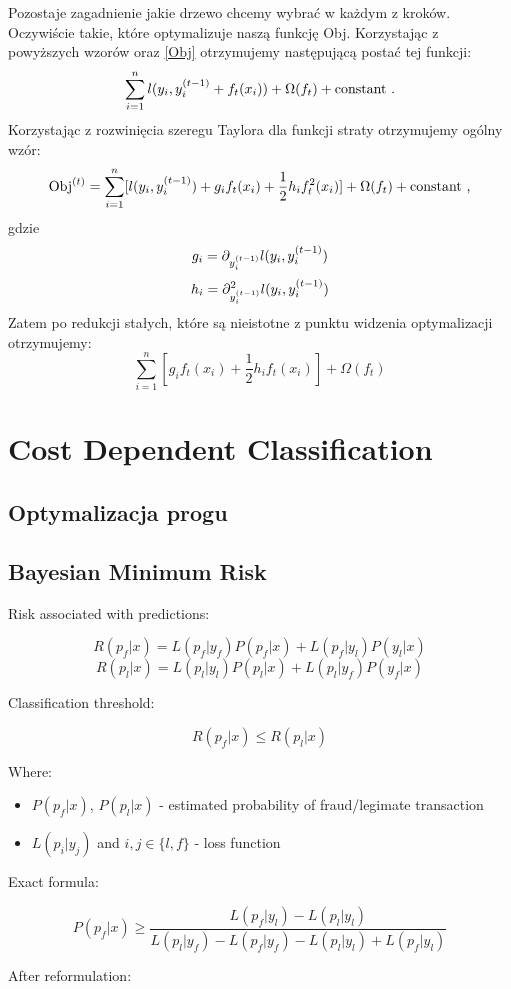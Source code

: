 \documentclass{book}
\begin{document}
	 Pozostaje zagadnienie jakie drzewo chcemy wybrać w każdym z kroków. Oczywiście takie, które optymalizuje naszą funkcję Obj. Korzystając z powyższych wzorów oraz \ref{Obj} otrzymujemy następującą postać tej funkcji:
	 $$ \sum_{i=1}^{n} l(y_i, y_i^{(t-1)} + f_t(x_i)) + \Omega(f_t) + \text{constant .}$$
	 Korzystając z rozwinięcia szeregu Taylora dla funkcji straty otrzymujemy ogólny wzór:
	 $$ \text{Obj}^{(t)} = \sum_{i=1}^{n} [l(y_i, y_i^{(t-1)}) + g_i f_t(x_i) + \frac{1}{2} h_i f_t^2(x_i)] + \Omega(f_t) + \text{constant ,} $$
	 gdzie 
	 $$ g_i = \partial_{y_i^{(t-1)}} l(y_i, y_i^{(t-1)}) $$
	 $$ h_i = \partial^2_{y_i^{(t-1)}} l(y_i, y_i^{(t-1)}) $$
	 Zatem po redukcji stałych, które są nieistotne z punktu widzenia optymalizacji otrzymujemy:
	 $$ \sum_{i=1}^{n} [g_i f_t(x_i) + \frac{1}{2} h_i f_t(x_i)] + \Omega(f_t) $$

\section{Cost Dependent Classification}
	
	\subsection{Optymalizacja progu}
	
	
	
	\subsection{Bayesian Minimum Risk}
	
	Risk associated with predictions:
	
	$$ R(p_f|x) = L(p_f|y_f)P(p_f|x) + L(p_f|y_l)P(y_l|x) $$
	$$ R(p_l|x) = L(p_l|y_l)P(p_l|x) + L(p_l|y_f)P(y_f|x) $$
	
	Classification threshold:
	
	$$ R(p_f|x) \leq R(p_l|x)$$
	
	Where:
	
	\begin{itemize}
		\item $P(p_f|x)$, $P(p_l|x)$ - estimated probability of fraud/legimate transaction
		\item $L(p_{i}|y_{j})$ and $i,j \in \{l,f\}$ - loss function
	\end{itemize}{}
	Exact formula:
	
	$$ P(p_f|x) \ge \frac{L(p_f|y_l) - L(p_l|y_l)}{L(p_l|y_f) - L(p_f|y_f) - L(p_l|y_l) + L(p_f|y_l)}$$
	
	After reformulation:
	
\end{document}
